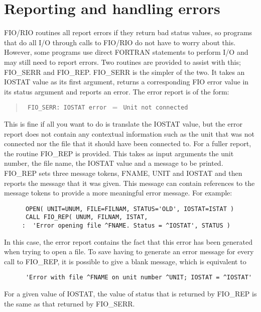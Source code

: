 \section{Reporting and handling errors}
\label{errors}

FIO/RIO routines all report errors if they return bad status values, so
programs that do all I/O through calls to FIO/RIO do not have to worry about
this. However, some programs use direct FORTRAN statements to perform I/O and
may still need to report errors. Two routines are provided to assist with this;
FIO\_SERR and FIO\_REP. FIO\_SERR is the simpler of the two. It takes an IOSTAT
value as its first argument, returns a corresponding FIO error value in its
status argument and reports an error. The error report is of the form:

\begin{quote}{\tt
FIO\_SERR: IOSTAT error $=$ Unit not connected
}
\end{quote}

This is fine if all you want to do is translate the IOSTAT value, but the error
report does not contain any contextual information such as the unit that was
not connected nor the file that it should have been connected to. For a fuller
report, the routine FIO\_REP is provided. This takes as input arguments the
unit number, the file name, the IOSTAT value and a message to be printed.
FIO\_REP sets three message tokens, FNAME, UNIT and IOSTAT and then reports the
message that it was given. This message can contain references to the message
tokens to provide a more meaningful error message. For example:

\begin{verbatim}
      OPEN( UNIT=UNUM, FILE=FILNAM, STATUS='OLD', IOSTAT=ISTAT )
      CALL FIO_REP( UNUM, FILNAM, ISTAT,
     :  'Error opening file ^FNAME. Status = ^IOSTAT', STATUS )
\end{verbatim}

In this case, the error report contains the fact that this error has been
generated when trying to open a file. To save having to generate an error
message for every call to FIO\_REP, it is possible to give a blank message,
which is equivalent to

\begin{verbatim}
      'Error with file ^FNAME on unit number ^UNIT; IOSTAT = ^IOSTAT'
\end{verbatim} %

For a given value of IOSTAT, the value of status that is returned by FIO\_REP
is the same as that returned by FIO\_SERR.

